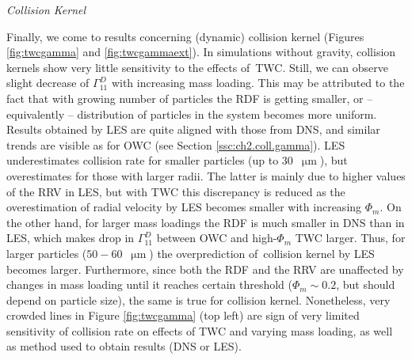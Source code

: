 \documentclass{pracamgren}
\begin{document}
\medskip

\emph{Collision Kernel}

Finally, we come to results concerning (dynamic) collision kernel (Figures \ref{fig:twcgamma} and \ref{fig:twcgammaext}).
In simulations without gravity, collision kernels show very little sensitivity to the effects of~TWC.
Still, we can observe slight decrease of $\Gamma^D_{11}$ with increasing mass loading.
This may be attributed to the fact that with growing number of particles the RDF is getting smaller, or -- equivalently -- distribution of particles in the system becomes more uniform.
Results obtained by LES are quite aligned with those from DNS, and similar trends are visible as for OWC (see Section \ref{ssc:ch2.coll.gamma}).
LES underestimates collision rate for smaller particles (up to $30$~$\upmu\text{m}$), but overestimates for those with larger radii.
The latter is mainly due to higher values of the RRV in LES, but with TWC this discrepancy is reduced as the overestimation of radial velocity by LES becomes smaller with increasing $\Phi_m$.
On the other hand, for larger mass loadings the RDF is much smaller in DNS than in LES, which makes drop in $\Gamma^D_{11}$ between OWC and high-$\Phi_m$ TWC larger.
Thus, for larger particles ($50-60$~$\upmu\text{m}$) the overprediction of~collision kernel by LES becomes larger.
Furthermore, since both the RDF and the RRV are unaffected by changes in mass loading until it reaches certain threshold ($\Phi_m \sim 0.2$, but should depend on particle size), the same is true for collision kernel.
Nonetheless, very crowded lines in Figure \ref{fig:twcgamma} (top left) are sign of very limited sensitivity of collision rate on effects of TWC and varying mass loading, as well as method used to obtain results (DNS or LES).
 
\end{document}

